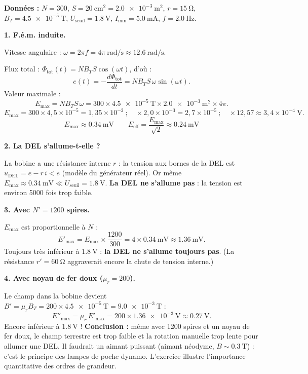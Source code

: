 \documentclass[11pt]{article}
\begin{document}
\begin{corrige}
\textbf{Données :} $N = 300$, $S = \SI{20}{\centi\meter\squared} = \SI{2,0e-3}{\square\meter}$, $r = \SI{15}{\ohm}$, $B_T = \SI{4,5e-5}{\tesla}$, $U_{\text{seuil}} = \SI{1,8}{\volt}$, $I_{\min} = \SI{5,0}{\milli\ampere}$, $f = \SI{2,0}{\hertz}$.

\textbf{1. F.é.m. induite.}

Vitesse angulaire : $\omega = 2\pi f = 4\pi\ \mathrm{rad/s} \approx \SI{12,6}{\radian\per\second}$.

Flux total : $\Phi_{\text{tot}}(t) = N B_T S\cos(\omega t)$, d'où :
\[
e(t) = -\dfrac{d\Phi_{\text{tot}}}{dt} = N B_T S\,\omega\sin(\omega t).
\]
Valeur maximale :
\[
E_{\max} = N B_T S\,\omega = 300\times \SI{4,5e-5}{\tesla}\times \SI{2,0e-3}{\square\meter}\times 4\pi.
\]
\[
E_{\max} = 300\times 4,5\times 10^{-5} = 1,35\times 10^{-2}\ ;\quad \times 2,0\times 10^{-3} = 2,7\times 10^{-5}\ ;\quad \times 12,57 \approx 3,4\times 10^{-4}\ \mathrm{V}.
\]
\[
\boxed{E_{\max} \approx \SI{0,34}{\milli\volt}} \qquad \boxed{E_{\text{eff}} = \dfrac{E_{\max}}{\sqrt{2}} \approx \SI{0,24}{\milli\volt}}
\]

\textbf{2. La DEL s'allume-t-elle ?}

La bobine a une résistance interne $r$ : la tension aux bornes de la DEL est $u_{\text{DEL}} = e - r\,i < e$ (modèle du générateur réel). Or même $E_{\max} \approx \SI{0,34}{\milli\volt} \ll U_{\text{seuil}} = \SI{1,8}{\volt}$. \textbf{La DEL ne s'allume pas} : la tension est environ 5000 fois trop faible.

\textbf{3. Avec $N' = 1200$ spires.}

$E_{\max}$ est proportionnelle à $N$ :
\[
E'_{\max} = E_{\max}\times\dfrac{1200}{300} = 4\times \SI{0,34}{\milli\volt} \approx \SI{1,36}{\milli\volt}.
\]
Toujours très inférieur à $\SI{1,8}{\volt}$ : \textbf{la DEL ne s'allume toujours pas}. (La résistance $r' = \SI{60}{\ohm}$ aggraverait encore la chute de tension interne.)

\textbf{4. Avec noyau de fer doux ($\mu_r = 200$).}

Le champ dans la bobine devient $B' = \mu_r B_T = 200\times \SI{4,5e-5}{\tesla} = \SI{9,0e-3}{\tesla}$ :
\[
E''_{\max} = \mu_r\,E'_{\max} = 200\times \SI{1,36e-3}{\volt} \approx \SI{0,27}{\volt}.
\]
Encore inférieur à $\SI{1,8}{\volt}$ ! \textbf{Conclusion :} même avec 1200 spires et un noyau de fer doux, le champ terrestre est trop faible et la rotation manuelle trop lente pour allumer une DEL. Il faudrait un aimant puissant (aimant néodyme, $B \sim \SI{0,3}{\tesla}$) : c'est le principe des lampes de poche dynamo. L'exercice illustre l'importance quantitative des ordres de grandeur.


\end{corrige}
\end{document}

